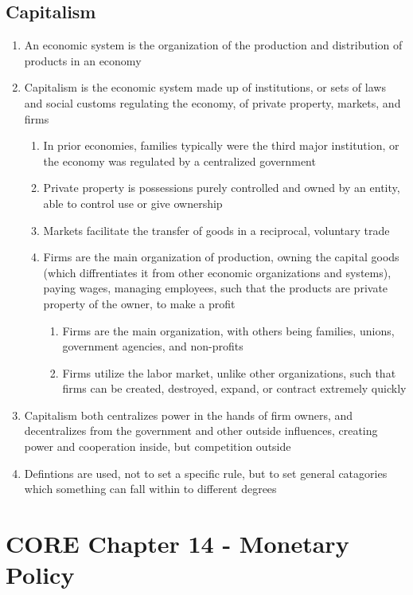 \documentclass[11 pt, twoside]{article}
\begin{document}
\subsection{Capitalism}
\begin{enumerate}
\item An economic system is the organization of the production and distribution of products in an economy
\item Capitalism is the economic system made up of institutions, or sets of laws and social customs regulating the economy, of private property, markets, and firms
\begin{enumerate}
\item In prior economies, families typically were the third major institution, or the economy was regulated by a centralized government
\item Private property is possessions purely controlled and owned by an entity, able to control use or give ownership
\item Markets facilitate the transfer of goods in a reciprocal, voluntary trade
\item Firms are the main organization of production, owning the capital goods (which diffrentiates it from other economic organizations and systems), paying wages, managing employees, such that the products are private property of the owner, to make a profit
\begin{enumerate}
\item Firms are the main organization, with others being families, unions, government agencies, and non-profits
\item Firms utilize the labor market, unlike other organizations, such that firms can be created, destroyed, expand, or contract extremely quickly
\end{enumerate} 
\end{enumerate}
\item Capitalism both centralizes power in the hands of firm owners, and decentralizes from the government and other outside influences, creating power and cooperation inside, but competition outside
\item Defintions are used, not to set a specific rule, but to set general catagories which something can fall within to different degrees
\end{enumerate}


\section{CORE Chapter 14 - Monetary Policy}
\end{document}
